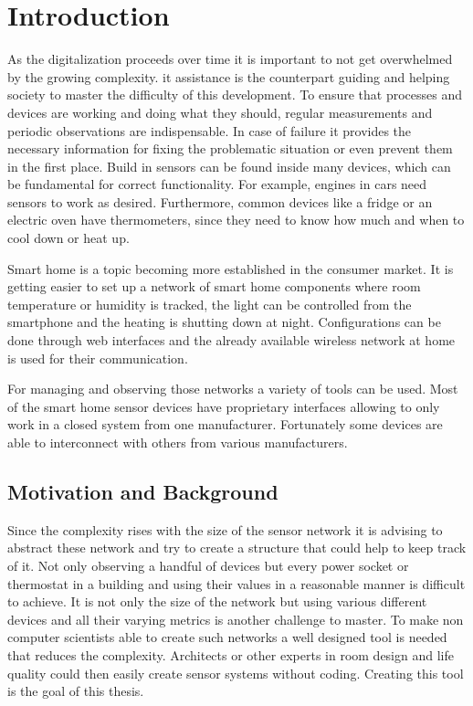 \chapter{Introduction}
As the digitalization proceeds over time it is important to not get overwhelmed by the growing complexity. \gls{it} assistance is the counterpart guiding and helping society to master the difficulty of this development. To ensure that processes and devices are working and doing what they should, regular measurements and periodic observations are indispensable. In case of failure it provides the necessary information for fixing the problematic situation or even prevent them in the first place. Build in sensors can be found inside many devices, which can be fundamental for correct functionality. For example, engines in cars need sensors to work as desired. Furthermore, common devices like a fridge or an electric oven have thermometers, since they need to know how much and when to cool down or heat up. 

Smart home is a topic becoming more established in the consumer market. It is getting easier to set up a network of smart home components where room temperature or humidity is tracked, the light can be controlled from the smartphone and the heating is shutting down at night. Configurations can be done through web interfaces and the already available wireless network at home is used for their communication.

For managing and observing those networks a variety of tools can be used. Most of the smart home sensor devices have proprietary interfaces allowing to only work in a closed system from one manufacturer. Fortunately some devices are able to interconnect with others from various manufacturers. 

\section{Motivation and Background}
Since the complexity rises with the size of the sensor network it is advising to abstract these network and try to create a structure that could help to keep track of it. Not only observing a handful of devices but every power socket or thermostat in a building and using their values in a reasonable manner is difficult to achieve. It is not only the size of the network but using various different devices and all their varying metrics is another challenge to master. To make non computer scientists able to create such networks a well designed tool is needed that reduces the complexity. Architects or other experts in room design and life quality could then easily create sensor systems without coding. Creating this tool is the goal of this thesis.

